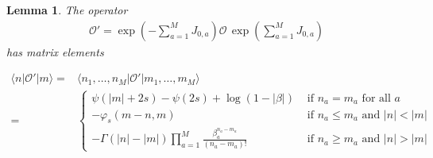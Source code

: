 \documentclass[11pt]{article}
\numberwithin{equation}{section}
\newtheorem{lemma}[theorem]{Lemma}
\newcommand{\M}{M}
\begin{document}
\begin{lemma}\label{lem:b2}
The operator
\begin{equation}
\begin{split}\label{O'}
\mathcal{O}'=
 \exp(-\sum_{a=1}^{\M}J_{0,a})\mathcal{O}\,\exp(\sum_{a=1}^{\M}J_{0,a})
 \end{split}
\end{equation}
has matrix elements

\begin{equation}
			\begin{split}
				\langle n|\mathcal{O}'|m\rangle=&\langle n_1,\ldots,n_\M|\mathcal{O}'|m_1,\ldots,m_\M\rangle\\=&\begin{cases}
					\psi(|m|+2s)-\psi(2s)+\log(1-|\beta|)& \text{ if }n_a=m_a \text{ for all } a\\
					-\varphi_s(m-n,m)& \text{ if }n_a\leq m_a \text{ and } |n|<|m|\\
					-\Gamma (|n|-|m|)\prod_{a=1}^{\M}\frac{\beta_{a}^{n_{a}-m_a}}{(n_{a}-m_a)!}
					&\text{ if } n_{a}\geq m_{a}\text{ and }|n|>|m|\;				\end{cases}
			\end{split}
		\end{equation}
\end{lemma}
\end{document}
